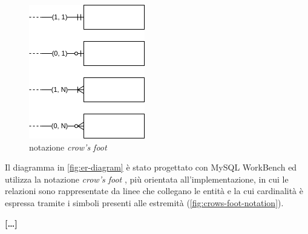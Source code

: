 \begin{figure}
	\includegraphics[width=\linewidth]{assets/diagrams/crows-foot-notation.png}
	\cprotect\caption{notazione \textit{crow's foot}}
	\label{fig:crows-foot-notation}
\end{figure}

Il diagramma in \autoref{fig:er-diagram} è stato progettato con MySQL WorkBench
\cite{workbench:9-EER} ed utilizza la notazione \textit{crow's foot}
\cite{wiki:crows-foot}, più orientata all'implementazione, in cui le relazioni
sono rappresentate da linee che collegano le entità e la cui cardinalità è
espressa tramite i simboli presenti alle estremità (\autoref{fig:crows-foot-notation}).

{\color{red}\textbf{[\dots]}}

